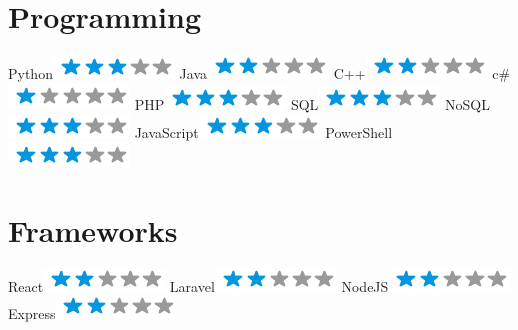 \begin{aside}
    \section{Programming}
      Python\includegraphics[scale=0.40]{img/3stars.png}
      Java\includegraphics[scale=0.40]{img/2stars.png}
      C++\includegraphics[scale=0.40]{img/2stars.png}
      c\#\includegraphics[scale=0.40]{img/1stars.png}
      PHP\includegraphics[scale=0.40]{img/3stars.png}
      SQL\includegraphics[scale=0.40]{img/3stars.png}
      NoSQL\includegraphics[scale=0.40]{img/3stars.png}
      JavaScript\includegraphics[scale=0.40]{img/3stars.png}
      PowerShell\includegraphics[scale=0.40]{img/3stars.png}
    \section{Frameworks}
      React\includegraphics[scale=0.40]{img/2stars.png}
      Laravel\includegraphics[scale=0.40]{img/2stars.png}
      NodeJS\includegraphics[scale=0.40]{img/2stars.png}
      Express\includegraphics[scale=0.40]{img/2stars.png}

\end{aside}
